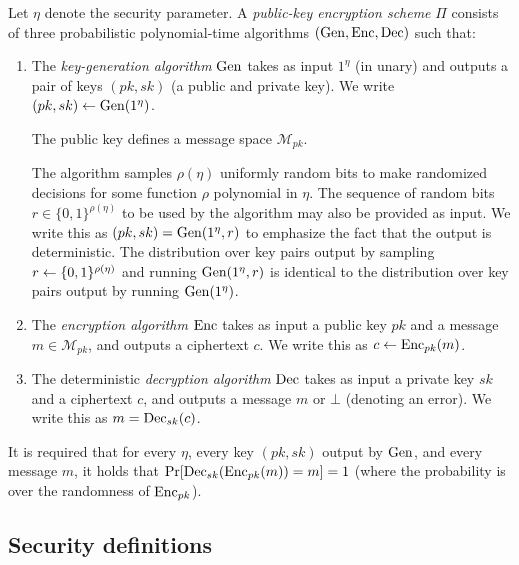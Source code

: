 \begin{definition} \label{def:public-key-encryption}
	Let $\eta$ denote the security parameter.
	A \emph{public-key encryption scheme} $\Pi$ consists of three probabilistic polynomial-time algorithms $(\mathrm{Gen}, \mathrm{Enc}, \mathrm{Dec})$ such that:
	\begin{enumerate}[1.]
		\item The \emph{key-generation algorithm} $\mathrm{Gen}$ takes as input $1^\eta$ (in unary) and outputs a pair of keys $(pk, sk)$ (a public and private key). We write $(pk, sk) \leftarrow \mathrm{Gen}(1^\eta)$.

		      The public key defines a message space $\mathcal{M}_{pk}$.

		      The algorithm samples $\rho(\eta)$ uniformly random bits to make randomized decisions for some function $\rho$ polynomial in $\eta$. The sequence of random bits $r \in \{0, 1\}^{\rho(\eta)}$ to be used by the algorithm may also be provided as input. We write this as $(pk, sk) = \mathrm{Gen}(1^\eta, r)$ to emphasize the fact that the output is deterministic. The distribution over key pairs output by sampling $r \leftarrow \{0, 1\}^{\rho(\eta)}$ and running $\mathrm{Gen}(1^\eta, r)$ is identical to the distribution over key pairs output by running $\mathrm{Gen}(1^\eta)$.


		\item The \emph{encryption algorithm} $\mathrm{Enc}$ takes as input a public key $pk$ and a message $m \in \mathcal{M}_{pk}$, and outputs a ciphertext $c$. We write this as $c \leftarrow \mathrm{Enc}_{pk}(m)$.
		\item The deterministic \emph{decryption algorithm} $\mathrm{Dec}$ takes as input a private key $sk$ and a ciphertext $c$, and outputs a message $m$ or $\bot$ (denoting an error). We write this as $m = \mathrm{Dec}_{sk}(c)$.
	\end{enumerate}

	It is required that for every $\eta$, every key $(pk, sk)$ output by $\mathrm{Gen}$, and every message $m$, it holds that $\pr{\dec_{sk}(\enc_{pk}(m)) = m} = 1$ (where the probability is over the randomness of $\mathrm{Enc}_{pk}$).
\end{definition}

\subsection{Security definitions} \label{sec:security-definitions}

